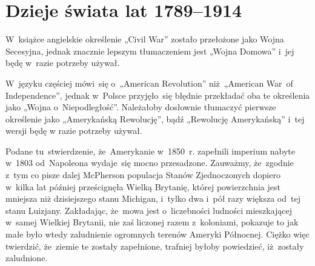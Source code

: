 \documentclass[a4paper,11pt]{article}
\begin{document}

\vspace{\spaceTwo}










\section{Dzieje świata lat 1789--1914}

\vspace{\spaceTwo}







\start W~książce angielskie określenie „Civil War” zostało
przełożone jako Wojna Secesyjna, jednak znacznie lepszym tłumaczeniem
jest „Wojna Domowa” i~jej będę w~razie potrzeby używał.

\vspace{\spaceFour}



\start W~języku częściej mówi~się o~„American Revolution”
niż~„American War~of Independence”, jednak w~Polsce przyjęło~się
błędnie przekładać oba te określenia jako „Wojna o~Niepodległość”.
Należałoby dosłownie tłumaczyć pierwsze określenie jako „Amerykańską
Rewolucję”, bądź „Rewolucję Amerykańską” i~tej wersji będę w razie
potrzeby używał.

\vspace{\spaceFour}







\start {} Podane tu~stwierdzenie, że~Amerykanie w~1850~r.
zapełnili imperium nabyte w~1803 od~Napoleona wydaje~się mocno
przesadzone. Zauważmy, że~zgodnie z~tym co pisze dalej McPherson
populacja Stanów Zjednoczonych dopiero w~kilka lat później
prześcignęła Wielką Brytanię, której powierzchnia jest mniejsza niż
dzisiejszego stanu Michigan, i~tylko dwa i~pół razy większa od~tej
stanu Luizjany. Zakładając, że~mowa jest o~liczebności ludności
mieszkającej w~samej Wielkiej Brytanii, nie zaś liczonej razem
z~koloniami, pokazuje to jak małe było wtedy zaludnienie ogromnych
terenów Ameryki Północnej. Ciężko więc twierdzić, że~ziemie te zostały
zapełnione, trafniej byłoby powiedzieć, iż~zostały zaludnione.
\end{document}
